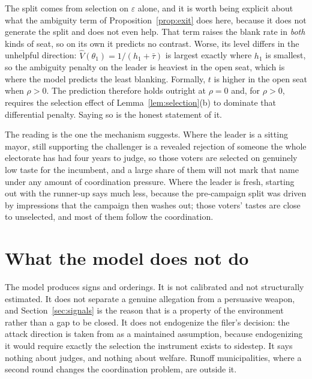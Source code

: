 \documentclass[11pt]{article}
\theoremstyle{definition}
\theoremstyle{remark}
\begin{document}
The split comes from selection on $\varepsilon$ alone, and it is worth being
explicit about what the ambiguity term of Proposition~\ref{prop:exit} does
here, because it does not generate the split and does not even help. That term
raises the blank rate in \emph{both} kinds of seat, so on its own it predicts
no contrast. Worse, its level differs in the unhelpful direction:
$\hat V(\theta_1) = 1/(h_1 + \bar\tau)$ is largest exactly where $h_1$ is
smallest, so the ambiguity penalty on the leader is heaviest in the open seat,
which is where the model predicts the least blanking. Formally, $t$ is higher
in the open seat when $\rho > 0$. The prediction therefore holds outright at
$\rho = 0$ and, for $\rho > 0$, requires the selection effect of
Lemma~\ref{lem:selection}(b) to dominate that differential penalty. Saying so
is the honest statement of it.

The reading is the one the mechanism suggests. Where the leader is a sitting
mayor, still supporting the challenger is a revealed rejection of someone the
whole electorate has had four years to judge, so those voters are selected on
genuinely low taste for the incumbent, and a large share of them will not mark
that name under any amount of coordination pressure. Where the leader is
fresh, starting out with the runner-up says much less, because the
pre-campaign split was driven by impressions that the campaign then washes
out; those voters' tastes are close to unselected, and most of them follow the
coordination.

\section{What the model does not do}
\label{sec:scope}

The model produces signs and orderings. It is not calibrated and not
structurally estimated. It does not separate a genuine allegation from a
persuasive weapon, and Section~\ref{sec:signals} is the reason that is a
property of the environment rather than a gap to be closed. It does not
endogenize the filer's decision: the attack direction is taken from
\citet{nakaguma2025} as a maintained assumption, because endogenizing it would
require exactly the selection the instrument exists to sidestep. It says
nothing about judges, and nothing about welfare. Runoff municipalities, where
a second round changes the coordination problem, are outside it.
\end{document}
